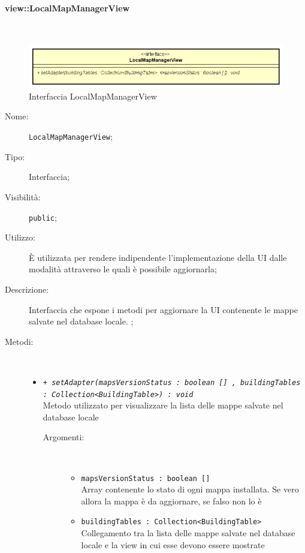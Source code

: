 \documentclass[../DefinizioneDiProdotto.tex]{subfiles}
\begin{document}
\paragraph{view::LocalMapManagerView}
\
\begin{figure}[H]
	\centering
	\includegraphics[width=\maxwidth]{img/LocalMapManagerView.png}
	\caption{Interfaccia LocalMapManagerView}\label{fig:view::LocalMapManagerView} 
\end{figure}
\begin{description}
	\item[Nome:] \texttt{LocalMapManagerView};
	\item[Tipo:] Interfaccia;
	\item[Visibilità:] \texttt{public};
	\item[Utilizzo:] È utilizzata per rendere indipendente l'implementazione della UI dalle modalità attraverso le quali è possibile aggiornarla;
	\item[Descrizione:] Interfaccia che espone i metodi per aggiornare la UI contenente le mappe salvate nel database locale. ;
	\item[Metodi:] \
	\begin{itemize}
		\item \texttt{+ \textit{setAdapter(mapsVersionStatus : boolean [] , buildingTables : Collection<BuildingTable>) : void}}\\
		Metodo utilizzato per visualizzare la lista delle mappe salvate nel database locale
		\begin{description}
			\item[Argomenti:] \
			\begin{itemize}
				\item \texttt{mapsVersionStatus : boolean [] }\\
				Array contenente lo stato di ogni mappa installata. Se vero allora la mappa è da aggiornare, se falso non lo è\item \texttt{buildingTables : Collection<BuildingTable>}\\
				Collegamento tra la lista delle mappe salvate nel database locale e la view in cui esse devono essere mostrate\end{itemize}
		\end{description}
	\end{itemize}
\end{description}
\end{document}
